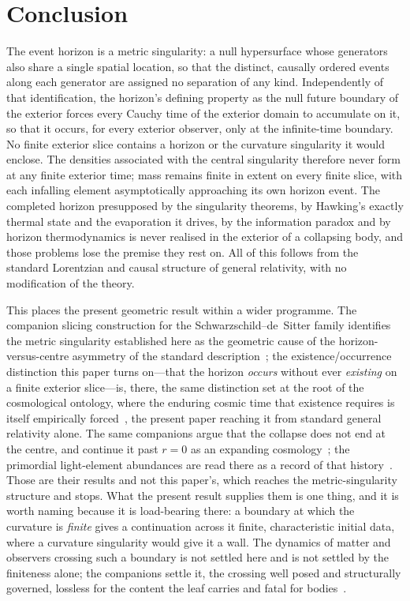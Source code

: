 \documentclass[11pt,a4paper]{article}
\theoremstyle{plain}
\theoremstyle{remark}
\begin{document}
\section{Conclusion}\label{sec:conclusion}
The event horizon is a metric singularity: a null hypersurface whose generators also share a single spatial location, so that the distinct, causally ordered events along each generator are assigned no separation of any kind. Independently of that identification, the horizon's defining property as the null future boundary of the exterior forces every Cauchy time of the exterior domain to accumulate on it, so that it occurs, for every exterior observer, only at the infinite-time boundary. No finite exterior slice contains a horizon or the curvature singularity it would enclose. The densities associated with the central singularity therefore never form at any finite exterior time; mass remains finite in extent on every finite slice, with each infalling element asymptotically approaching its own horizon event. The completed horizon presupposed by the singularity theorems, by Hawking's exactly thermal state and the evaporation it drives, by the information paradox and by horizon thermodynamics is never realised in the exterior of a collapsing body, and those problems lose the premise they rest on. All of this follows from the standard Lorentzian and causal structure of general relativity, with no modification of the theory.

This places the present geometric result within a wider programme. The companion slicing construction for the Schwarzschild--de~Sitter family identifies the metric singularity established here as the geometric cause of the horizon-versus-centre asymmetry of the standard description~\cite{JanzenSlicing}; the existence/occurrence distinction this paper turns on---that the horizon \emph{occurs} without ever \emph{existing} on a finite exterior slice---is, there, the same distinction set at the root of the cosmological ontology, where the enduring cosmic time that existence requires is itself empirically forced~\cite{JanzenModernParallax}, the present paper reaching it from standard general relativity alone. The same companions argue that the collapse does not end at the centre, and continue it past $r=0$ as an expanding cosmology~\cite{JanzenSlicing,JanzenCircle,JanzenCRframework}; the primordial light-element abundances are read there as a record of that history~\cite{JanzenCosmogenesis}. Those are their results and not this paper's, which reaches the metric-singularity structure and stops. What the present result supplies them is one thing, and it is worth naming because it is load-bearing there: a boundary at which the curvature is \emph{finite} gives a continuation across it finite, characteristic initial data, where a curvature singularity would give it a wall. The dynamics of matter and observers crossing such a boundary is not settled here and is not settled by the finiteness alone; the companions settle it, the crossing well posed and structurally governed, lossless for the content the leaf carries and fatal for bodies~\cite{JanzenCRcosmology,JanzenCRframework}.
\end{document}
